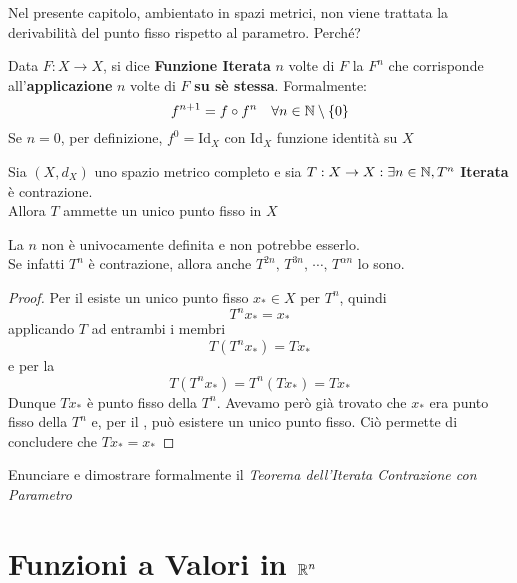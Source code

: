 \begin{exercise}
	Nel presente capitolo, ambientato in spazi metrici, non viene trattata la derivabilità del punto fisso rispetto al parametro. Perché?
\end{exercise}

\begin{definition}
	\label{def:iterata}
	Data $F:X \to X$, si dice \textbf{Funzione Iterata} $n$ volte di $F$ la $F^n$ che corrisponde all'\textbf{applicazione} $n$ volte di $F$ \textbf{su sè stessa}. Formalmente:
	\[f^{n+1} = f \circ f^n \quad \forall n \in \mathbb{N}\setminus\left\{0\right\}\]
	Se $n = 0$, per definizione, $f^0 = \mathrm{Id}_X$ con $\mathrm{Id}_X$ funzione identità su $X$
\end{definition}

\begin{theorem}
	\label{teo:iterata_contraz}
	Sia $(X,d_X)$ uno spazio metrico completo e sia $T:X \to X : \exists n \in \mathbb{N}, T^n$ \textbf{Iterata} è contrazione.\\
	Allora $T$ ammette un unico punto fisso in $X$
	\begin{note}
		La $n$ non è univocamente definita e non potrebbe esserlo.\\
		Se infatti $T^n$ è contrazione, allora anche $T^{2n},\, T^{3n},\, \cdots,\, T^{\alpha n}$ lo sono.
	\end{note}
	\begin{proof}
		Per il  esiste un unico punto fisso $x_* \in X$ per $T^n$, quindi
		\[T^nx_* = x_*\]
		applicando $T$ ad entrambi i membri
		\[T(T^{n}x_*) = Tx_*\]
		e per la 
		\[T(T^{n}x_*) = T^n(Tx_*) = Tx_*\]
		Dunque $Tx_*$ è punto fisso della $T^n$. Avevamo però già trovato che $x_*$ era punto fisso della $T^n$ e, per il , può esistere un unico punto fisso. Ciò permette di concludere che $Tx_* = x_*$
	\end{proof}
\end{theorem}
\begin{exercise}
	Enunciare e dimostrare formalmente il \textit{Teorema dell'Iterata Contrazione con Parametro}
\end{exercise}
\cbend

\newpage
{} %
\section{Funzioni a Valori in \texorpdfstring{$\protect \mathbb{R}^n$}{R\textasciicircum n}}

